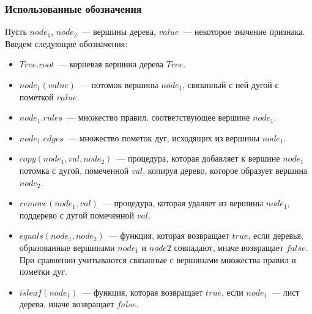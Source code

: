 \documentclass[oneside,final,12pt]{extarticle}
\begin{document}
           \subsubsection{Использованные обозначения}
                Пусть \(node_1\), \(node_2\)~--- вершины дерева, \(value\)~--- некоторое значение признака. Введем следующие обозначения:
                \begin{itemize}
                    \item \(Tree.root\)~--- корневая вершина дерева \(Tree\).
                    \item \(node_1(value)\)~--- потомок вершины \(node_1\), связанный с ней дугой с пометкой \(value\).
                    \item \(node_1.rules\)~--- множество правил, соответствующее вершине \(node_1\).
                    \item \(node_1.edges\)~--- множество пометок дуг, исходящих из вершины \(node_1\).
                    \item \(copy(node_1, val, node_2)\)~--- процедура, которая добавляет к вершине \(node_1\) потомка с дугой, помеченной \(val\), копируя дерево, которое образует вершина \(node_2\).
                    \item \(remove(node_1, val)\)~--- процедура, которая удаляет из вершины \(node_1\), поддерево с дугой помеченной \(val\). 
                    \item \(equals(node_1, node_2)\)~--- функция, которая возвращает \(true\), если деревья, образованные вершинами \(node_1\) и \(node2\) совпадают, иначе возвращает \(false\). При сравнении учитываются связанные с вершинами множества правил и пометки дуг.
                    \item \(isleaf(node_1)\)~--- функция, которая возвращает \(true\), если \(node_1\)~--- лист дерева, иначе возвращает \(false\).
                \end{itemize}
\end{document}
